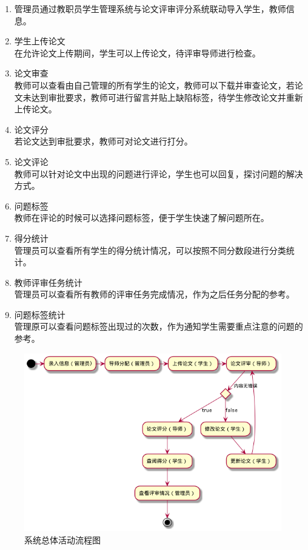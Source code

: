 \begin{enumerate}
    \item 管理员通过教职员学生管理系统与论文评审评分系统联动导入学生，教师信息。
    \item 学生上传论文\\
          在允许论文上传期间，学生可以上传论文，待评审导师进行检查。
    \item 论文审查\\
          教师可以查看由自己管理的所有学生的论文，教师可以下载并审查论文，若论文未达到审批要求，教师可进行留言并贴上缺陷标签，待学生修改论文并重新上传论文。
    \item 论文评分\\
          若论文达到审批要求，教师可对论文进行打分。
    \item 论文评论\\
          教师可以针对论文中出现的问题进行评论，学生也可以回复，探讨问题的解决方式。
    \item 问题标签\\
          教师在评论的时候可以选择问题标签，便于学生快速了解问题所在。
    \item 得分统计\\
          管理员可以查看所有学生的得分统计情况，可以按照不同分数段进行分类统计。
    \item 教师评审任务统计\\
          管理员可以查看所有教师的评审任务完成情况，作为之后任务分配的参考。
    \item 问题标签统计\\
          管理原可以查看问题标签出现过的次数，作为通知学生需要重点注意的问题的参考。

\end{enumerate}

\begin{figure}[htbp]
    \centering
    \includegraphics[scale = 0.6]{out/uml/流程图/系统总体活动流程图/系统总体活动流程图.png}
    \caption{\song\wuhao 系统总体活动流程图}
\end{figure}


